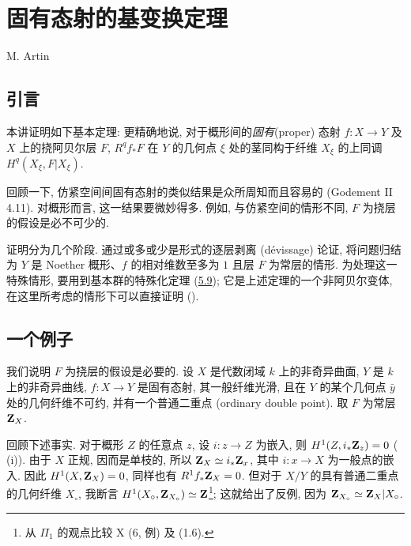 \chapter{固有态射的基变换定理}
\begin{center}
M. Artin
\end{center}
\label{sga4.exp.XII}

\setcounter{pageoriginal}{78}

\section{引言}\pageoriginale

本讲证明如下基本定理: 更精确地说, 对于概形间的\emph{固有}(proper) 态射 $f:X\to Y$ 及 $X$ 上的挠阿贝尔层 $F$, $R^qf_*F$ 在 $Y$ 的几何点 $\xi$ 处的茎同构于纤维 $X_\xi$ 的上同调 $H^q(X_\xi,F|X_\xi)$.

回顾一下, 仿紧空间间固有态射的类似结果是众所周知而且容易的 (Godement II 4.11). 对概形而言, 这一结果要微妙得多. 例如, 与仿紧空间的情形不同, $F$ 为挠层的假设是必不可少的.

证明分为几个阶段. 通过或多或少是形式的逐层剥离 (dévissage) 论证, 将问题归结为 $Y$ 是 Noether 概形、$f$ 的相对维数至多为 $1$ 且层 $F$ 为常层的情形. 为处理这一特殊情形, 要用到基本群的特殊化定理 (\hyperref[XII.thm5.9]{5.9}); 它是上述定理的一个非阿贝尔变体, 在这里所考虑的情形下可以直接证明 ().

\section{一个例子}\pageoriginale

我们说明 $F$ 为挠层的假设是必要的. 设 $X$ 是代数闭域 $k$ 上的非奇异曲面, $Y$ 是 $k$ 上的非奇异曲线, $f:X\to Y$ 是固有态射, 其一般纤维光滑, 且在 $Y$ 的某个几何点 $\bar y$ 处的几何纤维不可约, 并有一个普通二重点 (ordinary double point). 取 $F$ 为常层 $\mathbf{Z}_X$.

回顾下述事实. 对于概形 $Z$ 的任意点 $z$, 设 $i:z\to Z$ 为嵌入, 则 $H^1(Z,i_*\mathbf{Z}_z)=0$ ( (i)). 由于 $X$ 正规, 因而是单枝的, 所以 $\mathbf{Z}_X\simeq i_*\mathbf{Z}_x$, 其中 $i:x\to X$ 为一般点的嵌入. 因此 $H^1(X,\mathbf{Z}_X)=0$, 同样也有 $R^1f_*\mathbf{Z}_X=0$. 但对于 $X/Y$ 的具有普通二重点的几何纤维 $X_\circ$, 我断言 $H^1(X_\circ,\mathbf{Z}_{X_\circ})\simeq\mathbf{Z}$\footnote[1]{从 $\Pi_1$ 的观点比较  X (6, 例) 及 (1.6).}; 这就给出了反例, 因为 $\mathbf{Z}_{X_\circ}\simeq\mathbf{Z}_X|X_\circ$.

